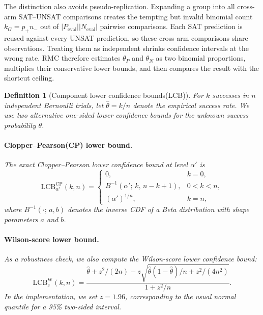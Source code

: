 \documentclass[conference]{IEEEtran}
\newtheorem{definition}{Definition}
\theoremstyle{remark}
\newcommand{\LCB}{\mathrm{LCB}}
\newcommand{\pp}{p_{+}}
\newcommand{\nm}{n_{-}}
\begin{document}
The distinction also avoids pseudo-replication.  Expanding a group into all cross-arm SAT--UNSAT comparisons creates the tempting but invalid binomial count $k_G=\pp\nm$ out of $|P_{\mathrm{eval}}||N_{\mathrm{eval}}|$ pairwise comparisons.  Each SAT prediction is reused against every UNSAT prediction, so these cross-arm comparisons share observations.  Treating them as independent shrinks confidence intervals at the wrong rate.  RMC therefore estimates $\theta_P$ and $\theta_N$ as two binomial proportions, multiplies their conservative lower bounds, and then compares the result with the shortcut ceiling.

\begin{definition}[Component lower confidence bounds(LCB)]
\label{def:component_lcb}
For $k$ successes in $n$ independent Bernoulli trials, let
$\hat{\theta}=k/n$ denote the empirical success rate.
We use two alternative one-sided lower confidence bounds for the unknown
success probability $\theta$.

\paragraph{Clopper--Pearson(CP) lower bound\cite{clopper1934use}.}
The exact Clopper--Pearson lower confidence bound at level $\alpha'$ is
\begin{equation}\label{eq:formula-29}
\LCB^{\mathrm{CP}}_{\alpha'}(k,n)
=
\begin{cases}
0, & k=0,\\[2pt]
B^{-1}(\alpha';\,k,\,n-k+1), & 0<k<n,\\[2pt]
(\alpha')^{1/n}, & k=n,
\end{cases}
\end{equation}
where $B^{-1}(\cdot;\,a,b)$ denotes the inverse CDF of a Beta distribution with
shape parameters $a$ and $b$.

\paragraph{Wilson-score lower bound\cite{wilson1927probable,brown2001interval}.}
As a robustness check, we also compute the Wilson-score lower confidence bound:
\begin{equation}\label{eq:formula-30}
\LCB^{\mathrm{W}}_{z}(k,n)
=
\frac{
\hat{\theta}+z^2/(2n)
-
z\sqrt{\hat{\theta}(1-\hat{\theta})/n+z^2/(4n^2)}
}
{1+z^2/n}.
\end{equation}
In the implementation, we set $z=1.96$, corresponding to the usual normal
quantile for a 95\% two-sided interval.
\end{definition}
\end{document}

